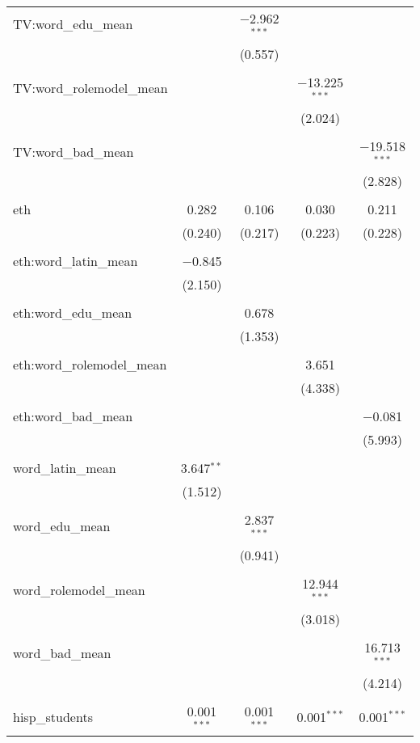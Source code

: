 \begin{table}[!htbp]
\begin{tabular}{@{\extracolsep{-2pt}}lcccc}
 TV:word\_edu\_mean &  & $-$2.962$^{***}$ &  &  \\ 
  &  & (0.557) &  &  \\ 
  & & & & \\ 
 TV:word\_rolemodel\_mean &  &  & $-$13.225$^{***}$ &  \\ 
  &  &  & (2.024) &  \\ 
  & & & & \\ 
 TV:word\_bad\_mean &  &  &  & $-$19.518$^{***}$ \\ 
  &  &  &  & (2.828) \\ 
  & & & & \\ 
 eth & 0.282 & 0.106 & 0.030 & 0.211 \\ 
  & (0.240) & (0.217) & (0.223) & (0.228) \\ 
  & & & & \\ 
 eth:word\_latin\_mean & $-$0.845 &  &  &  \\ 
  & (2.150) &  &  &  \\ 
  & & & & \\ 
 eth:word\_edu\_mean &  & 0.678 &  &  \\ 
  &  & (1.353) &  &  \\ 
  & & & & \\ 
 eth:word\_rolemodel\_mean &  &  & 3.651 &  \\ 
  &  &  & (4.338) &  \\ 
  & & & & \\ 
 eth:word\_bad\_mean &  &  &  & $-$0.081 \\ 
  &  &  &  & (5.993) \\ 
  & & & & \\ 
 word\_latin\_mean & 3.647$^{**}$ &  &  &  \\ 
  & (1.512) &  &  &  \\ 
  & & & & \\ 
 word\_edu\_mean &  & 2.837$^{***}$ &  &  \\ 
  &  & (0.941) &  &  \\ 
  & & & & \\ 
 word\_rolemodel\_mean &  &  & 12.944$^{***}$ &  \\ 
  &  &  & (3.018) &  \\ 
  & & & & \\ 
 word\_bad\_mean &  &  &  & 16.713$^{***}$ \\ 
  &  &  &  & (4.214) \\ 
  & & & & \\ 
 hisp\_students & 0.001$^{***}$ & 0.001$^{***}$ & 0.001$^{***}$ & 0.001$^{***}$ \\ 

\end{tabular}
\end{table}
